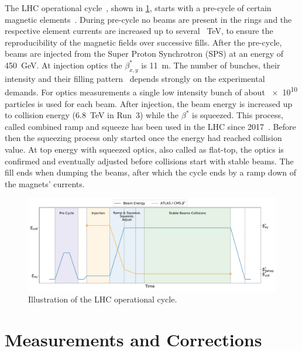 The LHC operational cycle~\cite{Report:LHCModes}, shown in \cref{fig:lhc_cycle}, starts with a pre-cycle of certain magnetic elements~\cite{Report:LHCMagnetsPreCycles}.
During pre-cycle no beams are present in the rings and the respective element currents are increased up to several \qty{}{\tera\electronvolt}, to ensure the reproducibility of the magnetic fields over successive fills.
After the pre-cycle, beams are injected from the Super Proton Synchrotron (SPS) at an energy of \qty{450}{\giga\electronvolt}.
At injection optics the \(\beta^{\ast}_{x,y}\) is \qty{11}{\metre}.
The number of bunches, their intensity and their filling pattern~\cite{Report:LHCStandardFillingSchemes} depends strongly on the experimental demands.
For optics measurements a single low intensity bunch of about \num{e10} particles is used for each beam.
After injection, the beam energy is increased up to collision energy (\qty{6.8}{\tera\electronvolt} in Run~3) while the \(\beta^{\ast}\) is squeezed.
This process, called combined ramp and squeeze has been used in the LHC since 2017~\cite{IPAC:Camillocci:CombinedRampAndSqueeze}.
Before then the squeezing process only started once the energy had reached collision value.
At top energy with squeezed optics, also called as flat-top, the optics is confirmed and eventually adjusted before collisions start with stable beams.
The fill ends when dumping the beams, after which the cycle ends by a ramp down of the magnets' currents.

\begin{figure}[h]
    \centering
    \includegraphics*[width=0.99\columnwidth]{Figures/Chapter3/lhc_cycle.pdf}
    \caption{Illustration of the LHC operational cycle.}
    \label{fig:lhc_cycle}
  \end{figure}


\section{Measurements and Corrections}


